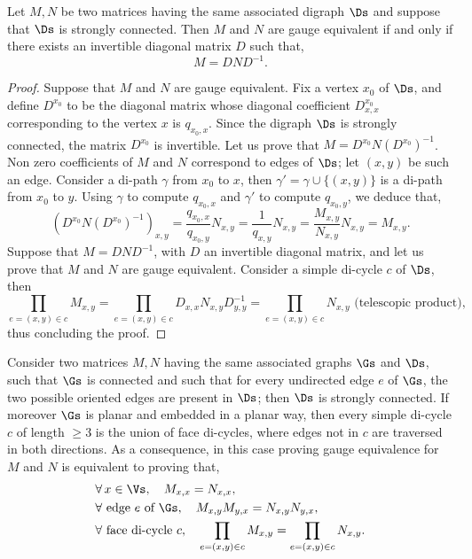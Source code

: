 \documentclass[a4paper,twoside,11pt]{article}
\begin{document}
\begin{lem}\label{lem:crit_gauge}
Let $M,N$ be two matrices having the same associated digraph $\Ds$ and suppose that $\Ds$ is strongly connected. Then 
$M$ and $N$ are gauge equivalent if and only if there exists an invertible diagonal matrix $D$ such that,
\[
M=D N D^{-1}.
\]
\end{lem}
\begin{proof}
Suppose that $M$ and $N$ are gauge equivalent. Fix a vertex $x_0$ of $\Ds$, and define $D^{x_0}$ to be the diagonal matrix whose
diagonal coefficient $D^{x_0}_{x,x}$ corresponding to the vertex $x$ is $q_{x_0,x}$. Since the digraph $\Ds$ is strongly 
connected,
the matrix $D^{x_0}$ is invertible. Let us prove that $M=D^{x_0}N(D^{x_0})^{-1}$. Non zero coefficients of $M$ and $N$ correspond to edges
of $\Ds$; let $(x,y)$ be such an edge. Consider a di-path $\gamma$ from $x_0$ to $x$, then $\gamma'=\gamma\cup\{(x,y)\}$
is a di-path from $x_0$ to $y$. Using $\gamma$ to compute $q_{x_0,x}$ and $\gamma'$ to compute $q_{x_0,y}$, we deduce that,
\begin{equation*}
(D^{x_0} N (D^{x_0})^{-1})_{x,y}=\frac{q_{x_0,x}}{q_{x_0,y}}N_{x,y}=\frac{1}{q_{x,y}}N_{x,y}=\frac{M_{x,y}}{N_{x,y}}N_{x,y}=M_{x,y}.
\end{equation*}
Suppose that $M=D N D^{-1}$, with $D$ an invertible diagonal matrix, and
let us prove that $M$ and $N$ are gauge equivalent.
Consider a simple di-cycle $c$ of $\Ds$, then
\begin{equation*}
\prod_{e=(x,y)\in c} M_{x,y}=\prod_{e=(x,y)\in c} D_{x,x} N_{x,y} D_{y,y}^{-1}=\prod_{e=(x,y)\in c}N_{x,y} \text{ (telescopic product)},
\end{equation*}
thus concluding the proof.
\end{proof}


\begin{rem}
Consider two matrices $M,N$ having the same associated graphs $\Gs$ and $\Ds$, such that $\Gs$ is connected and 
such that for every undirected edge $e$ of $\Gs$, the two possible oriented
edges are present in $\Ds$; then $\Ds$ is strongly connected. If moreover $\Gs$ is planar and embedded in a planar way, then
every simple di-cycle $c$ of length $\geq 3$ is the union of face di-cycles, where edges not in $c$ are traversed in both directions. 
As a consequence, in this case
proving gauge equivalence for $M$ and $N$ is equivalent to proving that,
\begin{align*}
&\forall\,x\in\Vs,\quad M_{x,x}=N_{x,x},\\
&\forall\text{ edge $e$ of $\Gs$},\quad M_{x,y}M_{y,x}=N_{x,y}N_{y,x},\\
&\forall\text{ face di-cycle } c,\quad \prod_{e=(x,y)\in c} M_{x,y}=\prod_{e=(x,y)\in c} N_{x,y}.
\end{align*}
\end{rem}
\end{document}
